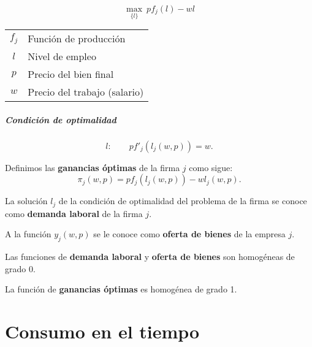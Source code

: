 \documentclass[8pt,a4paper]{extarticle}
\begin{document}
\begin{multicols}{3}
\begin{equation*}
	\max_{\{l\}}\ pf_j (l) - wl
\end{equation*}

\begin{center}
\begin{tabular}{ c l }
	\hline
	$f_j$ & Función de producción \\
	$l$	  & Nivel de empleo \\
	$p$   & Precio del bien final \\
	$w$   & Precio del trabajo (salario) \\
	\hline
\end{tabular}
\end{center}

\subsubsection*{Condición de optimalidad}

\[
	l : \qquad pf'_j(l_j(w,p)) = w
.\] 

\begin{boxdef}
	Definimos las \textbf{ganancias óptimas} de la firma $j$ como sigue:
	\[
		\pi_j(w,p) = pf_j(l_j(w,p)) - wl_j(w,p)
	.\] 
\end{boxdef}

\begin{boxdef}
	La solución $l_j$ de la condición de optimalidad del problema de la firma se conoce como \textbf{demanda laboral} de la firma $j$.
\end{boxdef}

\begin{boxdef}
	A la función $y_j(w,p)$ se le conoce como \textbf{oferta de bienes} de la empresa $j$.
\end{boxdef}

\begin{boxprop}
	Las funciones de \textbf{demanda laboral} y \textbf{oferta de bienes}  son homogéneas de grado 0.
\end{boxprop}

\begin{boxprop}
	La función de \textbf{ganancias óptimas} es homogénea de grado 1.
\end{boxprop}

\newpage

\part{Consumo en el tiempo}


\end{multicols}
\end{document}
